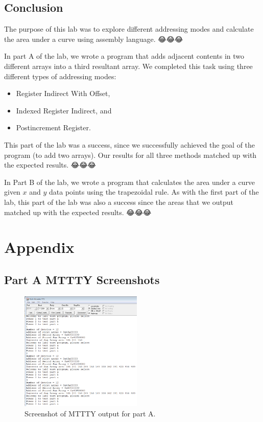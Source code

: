 \documentclass[10pt, letterpaper, titlepage]{article} %
\begin{document}
\begin{multicols*}{2}
\section{Conclusion}
The purpose of this lab was to explore different addressing modes and calculate the area under a curve using assembly language.  😂😂😂

In part A of the lab, we wrote a program that adds adjacent contents in two different arrays into a third resultant array. 
We completed this task using three different types of addressing modes:
\begin{itemize}
	\item Register Indirect With Offset,
	\item Indexed Register Indirect, and
	\item Postincrement Register.
\end{itemize}
This part of the lab was a success, since we successfully achieved the goal of the program (to add two arrays). 
Our results for all three methods matched up with the expected results. 😂😂😂

In Part B of the lab, we wrote a program that calculates the area under a curve given $x$ and $y$ data points using the trapezoidal rule. As with the first part of the lab, this part of the lab was also a success since the areas that we output matched up with the expected results. 😂😂😂 


\end{multicols*}

\newpage

\section{Appendix}
\subsection{Part A MTTTY Screenshots}
\begin{figure}[H]
   \includegraphics[width=0.52\textwidth]{mttypartA.png}
   \centering  
   \caption{Screenshot of MTTTY output for part A.} 
   \label{figure:6}
\end{figure}
\end{document}
